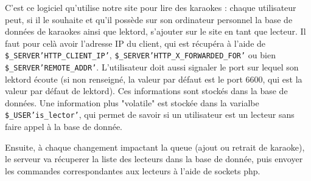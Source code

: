 C'est ce logiciel qu'utilise notre site pour lire des karaokes : chaque utilisateur peut, si il le souhaite et qu'il possède sur son ordinateur personnel la base de données de karaokes ainsi que lektord, s'ajouter sur le site en tant que lecteur. Il faut pour celà avoir l'adresse IP du client, qui est récupéra à l'aide de \texttt{\$\_SERVER\lbrack'HTTP\_CLIENT\_IP'\rbrack}, \texttt{\$\_SERVER\lbrack'HTTP\_X\_FORWARDED\_FOR'\rbrack} ou bien \texttt{\$\_SERVER\lbrack'REMOTE\_ADDR'\rbrack}.
L'utilisateur doit aussi signaler le port sur lequel son lektord écoute (si non renseigné, la valeur par défaut est le port 6600, qui est la valeur par défaut de lektord).
Ces informations sont stockés dans la base de données.
Une information plus "volatile" est stockée dans la varialbe \texttt{\$\_USER\lbrack'is\_lector'\rbrack}, qui permet de savoir si un utilisateur est un lecteur sans faire appel à la base de donnée.

Ensuite, à chaque changement impactant la queue (ajout ou retrait de karaoke), le serveur va récuperer la liste des lecteurs dans la base de donnée, puis envoyer les commandes correspondantes aux lecteurs à l'aide de sockets php.

